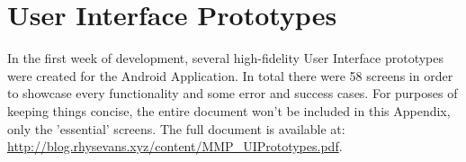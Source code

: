 \chapter{User Interface Prototypes}
In the first week of development, several high-fidelity User Interface prototypes were created for the Android Application. In total there were 58 screens in order to showcase every functionality and some error and success cases. For purposes of keeping things concise, the entire document won't be included in this Appendix, only the 'essential' screens. The full document is available at: \url{http://blog.rhysevans.xyz/content/MMP_UIPrototypes.pdf}.




